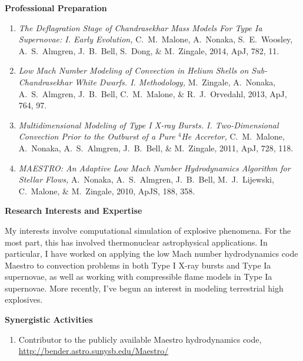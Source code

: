 \documentclass[11pt,letterpaper,english]{article}
\begin{document}
\begin{flushleft} {\bf Professional Preparation}
\begin{enumerate}
\item {\it The Deflagration Stage of Chandrasekhar Mass Models For
  Type Ia Supernovae: I. Early Evolution, } C.~M.~Malone, A.~Nonaka,
  S.~E.~Woosley, A.~S.~Almgren, J.~B.~Bell, S.~Dong, \& M.~Zingale,
  2014, ApJ, 782, 11.

\item {\it Low Mach Number Modeling of Convection in Helium Shells on
  Sub-Chandrasekhar White Dwarfs. I. Methodology,} M.~Zingale,
  A.~Nonaka, A.~S.~Almgren, J.~B.~Bell, C.~M.~Malone, \&
  R.~J.~Orvedahl, 2013, ApJ, 764, 97.

\item {\it Multidimensional Modeling of Type I X-ray
  Bursts. I. Two-Dimensional Convection Prior to the Outburst of a
  Pure $^4$He Accretor, } C.~M.~Malone, A.~Nonaka, A.~S.~Almgren,
  J.~B.~Bell, \& M.~Zingale, 2011, ApJ, 728, 118.

\item {\it MAESTRO: An Adaptive Low Mach Number Hydrodynamics
  Algorithm for Stellar Flows,} A.~Nonaka, A.~S.~Almgren, J.~B.~Bell,
  M.~J.~Lijewski, C.~Malone, \& M.~Zingale, 2010, ApJS, 188, 358.

\end{enumerate} 

\vspace{-6pt}
{\bf Research Interests and Expertise}
{\parindent 16pt

My interests involve computational simulation of explosive phenomena.
For the most part, this has involved thermonuclear astrophysical
applications.  In particular, I have worked on applying the low Mach
number hydrodynamics code Maestro to convection problems in both Type
I X-ray bursts and Type Ia supernovae, as well as working with
compressible flame models in Type Ia supernovae.  More recently, I've
begun an interest in modeling terrestrial high explosives.

}


\vspace{.04in}
{\bf Synergistic Activities}
\vspace{-6pt}
\begin{enumerate} \itemsep1pt \parskip0pt 

\item Contributor to the publicly available Maestro hydrodynamics
  code, \url{http://bender.astro.sunysb.edu/Maestro/}\\


\end{enumerate}
\end{flushleft}
\end{document}
